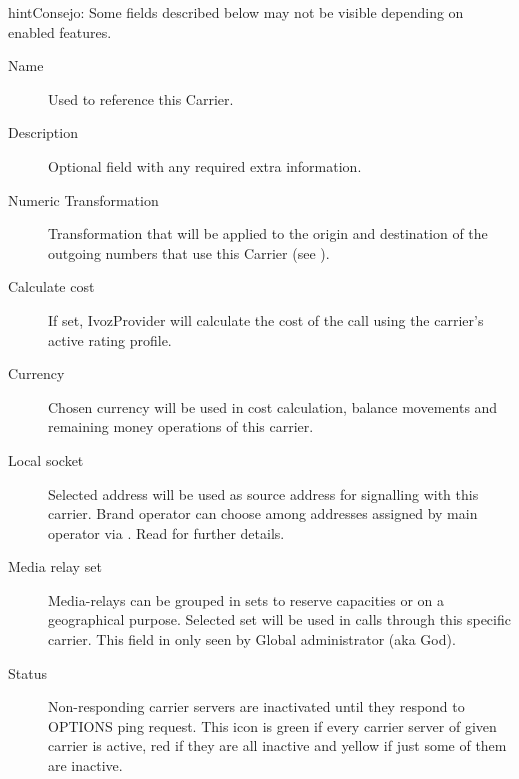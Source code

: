 \documentclass[letterpaper,10pt,spanish]{sphinxmanual}
\begin{document}
\begin{notice}{hint}{Consejo:}
Some fields described below may not be visible depending on enabled features.
\begin{description}
\item[{Name}] \leavevmode
Used to reference this Carrier.

\item[{Description}] \leavevmode
Optional field with any required extra information.

\item[{Numeric Transformation}] \leavevmode
Transformation that will be applied to the origin and destination of the
outgoing numbers that use this Carrier
(see {\hyperref[administration_portal/brand/settings/numeric_transformations:numeric\string-transformations]{}}).

\item[{Calculate cost}] \leavevmode
If set, IvozProvider will calculate the cost of the call using the carrier's active rating profile.

\item[{Currency}] \leavevmode
Chosen currency will be used in cost calculation, balance movements and
remaining money operations of this carrier.

\item[{Local socket}] \leavevmode
Selected address will be used as source address for signalling with this carrier. Brand operator can choose among
addresses assigned by main operator via {\hyperref[administration_portal/platform/brands:brands]{}}. Read {\hyperref[administration_portal/platform/infrastructure/proxy_trunks:proxy\string-trunks]{}} for further details.

\item[{Media relay set}] \leavevmode
Media-relays can be grouped in sets to reserve capacities or on a geographical purpose. Selected set will be used
in calls through this specific carrier. This field in only seen by Global administrator (aka God).

\item[{Status}] \leavevmode
Non-responding carrier servers are inactivated until they respond to OPTIONS ping request. This icon is green if
every carrier server of given carrier is active, red if they are all inactive and yellow if just some of them are inactive.

\end{description}
\end{notice}
\end{document}

